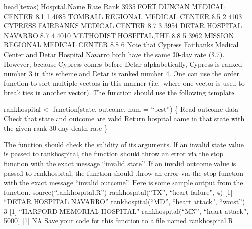 \documentclass[
]{article}
\begin{document}
head(texas) Hospital.Name Rate Rank 3935 FORT DUNCAN MEDICAL CENTER 8.1
1 4085 TOMBALL REGIONAL MEDICAL CENTER 8.5 2 4103 CYPRESS FAIRBANKS
MEDICAL CENTER 8.7 3 3954 DETAR HOSPITAL NAVARRO 8.7 4 4010 METHODIST
HOSPITAL,THE 8.8 5 3962 MISSION REGIONAL MEDICAL CENTER 8.8 6 Note that
Cypress Fairbanks Medical Center and Detar Hospital Navarro both have
the same 30-day rate (8.7). However, because Cypress comes before Detar
alphabetically, Cypress is ranked number 3 in this scheme and Detar is
ranked number 4. One can use the order function to sort multiple vectors
in this manner (i.e.~where one vector is used to break ties in another
vector). The function should use the following template.

rankhospital \textless- function(state, outcome, num = ``best'') \{ Read
outcome data Check that state and outcome are valid Return hospital name
in that state with the given rank 30-day death rate \}

The function should check the validity of its arguments. If an invalid
state value is passed to rankhospital, the function should throw an
error via the stop function with the exact message ``invalid state''. If
an invalid outcome value is passed to rankhospital, the function should
throw an error via the stop function with the exact message ``invalid
outcome''. Here is some sample output from the function.
source(``rankhospital.R'') rankhospital(``TX'', ``heart failure'', 4)
{[}1{]} ``DETAR HOSPITAL NAVARRO'' rankhospital(``MD'', ``heart
attack'', ``worst'') 3 {[}1{]} ``HARFORD MEMORIAL HOSPITAL''
rankhospital(``MN'', ``heart attack'', 5000) {[}1{]} NA Save your code
for this function to a file named rankhospital.R
\end{document}
